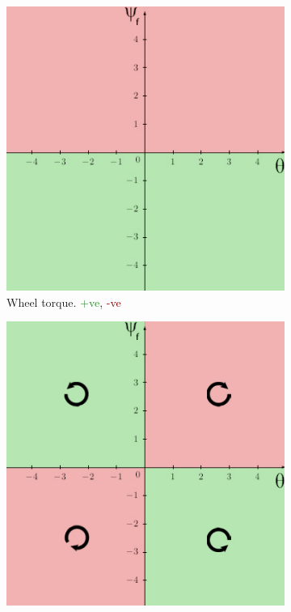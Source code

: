\documentclass[twoside,twocolumn,12pt]{article}
\begin{document}
\begin{figure}[t]
  \centering
  \begin{subfigure}[t]{0.325\textwidth}
  \centering
    \includegraphics[width=\linewidth]{wheel}
   \caption{Wheel torque. \textcolor{ForestGreen}{+ve}, \textcolor{Maroon}{-ve}}
  \label{fig:wt}
  \end{subfigure}
  \begin{subfigure}[t]{0.325\textwidth}
  \centering
    \includegraphics[width=\linewidth]{flywheel}

\end{subfigure}
\end{figure}
\end{document}
